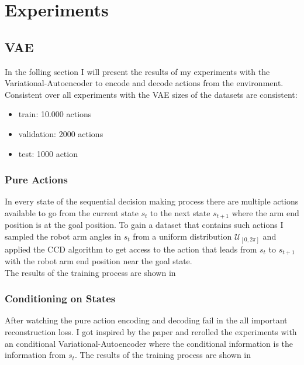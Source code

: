 \chapter{Experiments}\label{chap:experiments}

% 
% 

\section{VAE}

In the folling section I will present the results of my experiments with the Variational-Autoencoder to encode and decode actions from the environment.
Consistent over all experiments with the VAE sizes of the datasets are consistent:
\begin{itemize}
    \item train: 10.000 actions
    \item validation: 2000 actions
    \item test: 1000 action
\end{itemize}


\subsection{Pure Actions}

In every state of the sequential decision making process there are multiple actions available to go from the current state $s_t$ to the next state $s_{t+1}$ where the arm end position is at the goal position. To gain a dataset that contains such actions I sampled the robot arm angles in $s_t$ from a uniform distribution $\mathcal{U}_[0, 2\pi]$ and applied the CCD algorithm to get access to the action that leads from $s_t$ to $s_{t+1}$ with the robot arm end position near the goal state.\\

The results of the training process are shown in \figref{}

\subsection{Conditioning on States}

After watching the pure action encoding and decoding fail in the all important reconstruction loss. I got inspired by the paper  and rerolled the experiments with an conditional Variational-Autoencoder where the conditional information is the information from $s_t$. 
The results of the training process are shown in \figref{}


